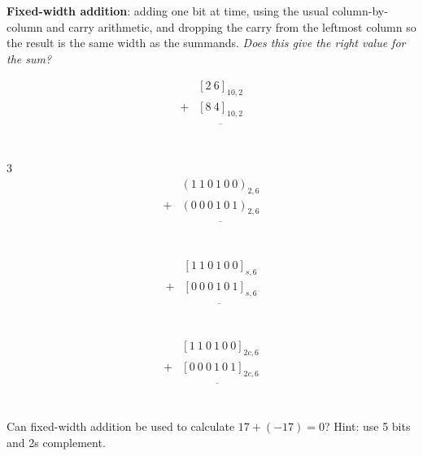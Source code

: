 
{\bf Fixed-width addition}: adding one bit at time, using the usual column-by-column and carry arithmetic, and dropping the carry from the leftmost column so the result is the same width as the summands.  {\it Does this give the right value for the sum?}


\begin{align*}
   & [2~ 6]_{10,2}\\
+ &  [8~ 4]_{10,2}\\
&\overline{\phantom{[0~0]_{10,2}}}\\
\end{align*}

\vfill

\begin{multicols}{3}
   \begin{align*}
      & (1~ 1~ 0~ 1~ 0~ 0)_{2,6}\\
   + & (0~ 0~ 0~ 1~ 0~ 1)_{2,6}\\
   &\overline{\phantom{(1~1~1~0~0~1)_{2,6}}}\\
   \end{align*}
   
   \begin{align*}
      & [1~ 1~ 0~ 1~ 0~ 0]_{s,6}\\
   + & [0~ 0~ 0~ 1~ 0~ 1]_{s,6}\\
   &\overline{\phantom{(1~1~1~0~0~1)_2}}\\
   \end{align*}
   
   \begin{align*}
      & [1~ 1~ 0~ 1~ 0~ 0]_{2c,6}\\
   + & [0~ 0~ 0~ 1~ 0~ 1]_{2c,6}\\
   &\overline{\phantom{(1~1~1~0~0~1)_2}}\\
   \end{align*}
\end{multicols}
\vfill

Can fixed-width addition be used to calculate $17 + (-17) = 0$?
Hint: use 5 bits and 2s complement.

\vfill


\newpage